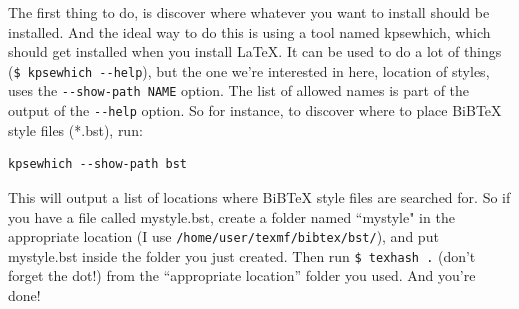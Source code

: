   The first thing to do, is discover where whatever you want to install should 
  be installed. And the ideal way to do this is using a tool named kpsewhich, 
  which should get installed when you install LaTeX. It can be used to do a lot 
  of things (\verb+$ kpsewhich --help+), but the one we’re interested in here, 
  location of styles, uses the \verb+--show-path NAME+ option. The list of 
  allowed names is part of the output of the \verb+--help+ option. So for 
  instance, to discover where to place BiBTeX style files (*.bst), run:
  \begin{verbatim}
kpsewhich --show-path bst
  \end{verbatim}

  This will output a list of locations where BiBTeX style files are searched 
  for. So if you have a file called mystyle.bst, create a folder named 
  ``mystyle" in the appropriate location (I use 
  \verb+/home/user/texmf/bibtex/bst/+), and put mystyle.bst inside the folder 
  you just created. Then run \verb+$ texhash .+ (don’t forget the dot!) from the 
  ``appropriate location'' folder you used. And you're done!
